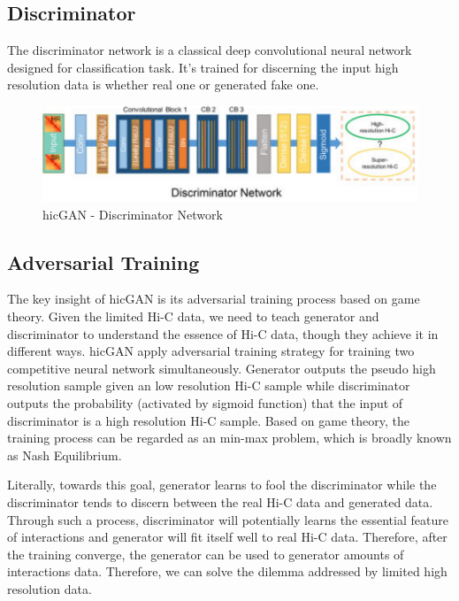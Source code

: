\documentclass{article}
\begin{document}
\subsection{Discriminator}

The discriminator network is a classical deep convolutional neural network designed for classification task. It's trained for discerning the input high resolution data is whether real one or generated fake one.

\begin{figure}[H]
    \centering
    \includegraphics[scale=0.3]{./docs/hicgan_dis.png}
    \caption{hicGAN - Discriminator Network}
\end{figure}

\subsection{Adversarial Training}

The key insight of hicGAN is its adversarial training process based on game theory. Given the limited Hi-C data, we need to teach generator and discriminator to understand the essence of Hi-C data, though they achieve it in different ways. hicGAN apply adversarial training strategy for training two competitive neural network simultaneously. Generator outputs the pseudo high resolution sample given an low resolution Hi-C sample while discriminator outputs the probability (activated by sigmoid function) that the input of discriminator is a high resolution Hi-C sample. Based on game theory, the training process can be regarded as an min-max problem, which is broadly known as Nash Equilibrium.

Literally, towards this goal, generator learns to fool the discriminator while the discriminator tends to discern between the real Hi-C data and generated data. Through such a process, discriminator will potentially learns the essential feature of interactions and generator will fit itself well to real Hi-C data. Therefore, after the training converge, the generator can be used to generator amounts of interactions data. Therefore, we can solve the dilemma addressed by limited high resolution data.
\end{document}
